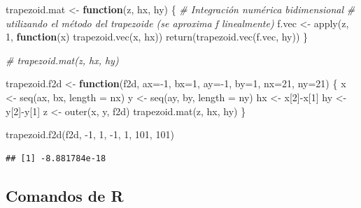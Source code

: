 \documentclass[
]{book}
\newenvironment{Shaded}{\begin{snugshade}}{\end{snugshade}}
\newcommand{\AttributeTok}[1]{\textcolor[rgb]{0.77,0.63,0.00}{#1}}
\newcommand{\CommentTok}[1]{\textcolor[rgb]{0.56,0.35,0.01}{\textit{#1}}}
\newcommand{\ControlFlowTok}[1]{\textcolor[rgb]{0.13,0.29,0.53}{\textbf{#1}}}
\newcommand{\DecValTok}[1]{\textcolor[rgb]{0.00,0.00,0.81}{#1}}
\newcommand{\FunctionTok}[1]{\textcolor[rgb]{0.00,0.00,0.00}{#1}}
\newcommand{\NormalTok}[1]{#1}
\newcommand{\OtherTok}[1]{\textcolor[rgb]{0.56,0.35,0.01}{#1}}
\newcommand{\SpecialCharTok}[1]{\textcolor[rgb]{0.00,0.00,0.00}{#1}}
\theoremstyle{break}
\theoremstyle{nonumberplain}
\begin{document}
\begin{Shaded}
\begin{Highlighting}[]
\NormalTok{trapezoid.mat }\OtherTok{\textless{}{-}} \ControlFlowTok{function}\NormalTok{(z, hx, hy) \{ }
\CommentTok{\# Integración numérica bidimensional}
\CommentTok{\# utilizando el método del trapezoide (se aproxima f linealmente)}
\NormalTok{  f.vec }\OtherTok{\textless{}{-}} \FunctionTok{apply}\NormalTok{(z, }\DecValTok{1}\NormalTok{, }\ControlFlowTok{function}\NormalTok{(x) }\FunctionTok{trapezoid.vec}\NormalTok{(x, hx))}
  \FunctionTok{return}\NormalTok{(}\FunctionTok{trapezoid.vec}\NormalTok{(f.vec, hy)) }
\NormalTok{\}}

\CommentTok{\# trapezoid.mat(z, hx, hy) }

\NormalTok{trapezoid.f2d }\OtherTok{\textless{}{-}} \ControlFlowTok{function}\NormalTok{(f2d, }\AttributeTok{ax=}\SpecialCharTok{{-}}\DecValTok{1}\NormalTok{, }\AttributeTok{bx=}\DecValTok{1}\NormalTok{, }\AttributeTok{ay=}\SpecialCharTok{{-}}\DecValTok{1}\NormalTok{, }\AttributeTok{by=}\DecValTok{1}\NormalTok{, }\AttributeTok{nx=}\DecValTok{21}\NormalTok{, }\AttributeTok{ny=}\DecValTok{21}\NormalTok{) \{ }
\NormalTok{  x }\OtherTok{\textless{}{-}} \FunctionTok{seq}\NormalTok{(ax, bx, }\AttributeTok{length =}\NormalTok{ nx)}
\NormalTok{  y }\OtherTok{\textless{}{-}} \FunctionTok{seq}\NormalTok{(ay, by, }\AttributeTok{length =}\NormalTok{ ny)}
\NormalTok{  hx }\OtherTok{\textless{}{-}}\NormalTok{ x[}\DecValTok{2}\NormalTok{]}\SpecialCharTok{{-}}\NormalTok{x[}\DecValTok{1}\NormalTok{]}
\NormalTok{  hy }\OtherTok{\textless{}{-}}\NormalTok{ y[}\DecValTok{2}\NormalTok{]}\SpecialCharTok{{-}}\NormalTok{y[}\DecValTok{1}\NormalTok{]}
\NormalTok{  z }\OtherTok{\textless{}{-}} \FunctionTok{outer}\NormalTok{(x, y, f2d)}
  \FunctionTok{trapezoid.mat}\NormalTok{(z, hx, hy)}
\NormalTok{\}}

\FunctionTok{trapezoid.f2d}\NormalTok{(f2d, }\SpecialCharTok{{-}}\DecValTok{1}\NormalTok{, }\DecValTok{1}\NormalTok{, }\SpecialCharTok{{-}}\DecValTok{1}\NormalTok{, }\DecValTok{1}\NormalTok{, }\DecValTok{101}\NormalTok{, }\DecValTok{101}\NormalTok{) }
\end{Highlighting}
\end{Shaded}

\begin{verbatim}
## [1] -8.881784e-18
\end{verbatim}

\hypertarget{comandos-de-r-1}{%
\subsection{Comandos de R}\label{comandos-de-r-1}}
\end{document}
